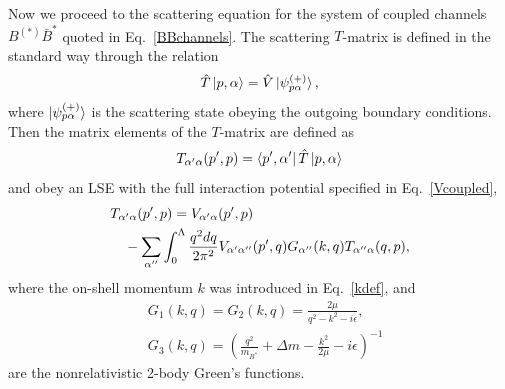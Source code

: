 \documentclass[aps,prd,showpacs,amsmath,twocolumn,superscriptaddress,floatfix,nofootinbib,notitlepage]{revtex4-2}
\newcommand{\be}{\begin{equation}}
\newcommand{\ee}{\end{equation}}
\begin{document}
Now we proceed to the scattering equation for the system of coupled channels $B^{(*)}\bar{B}^*$ quoted in Eq.~\eqref{BBchannels}. 
The scattering $T$-matrix is defined in the standard way through the relation
\be
\hat T \ket{p,\alpha} =\hat{V}\ket{\psi^{(+)}_{p\alpha}},
\ee
where $\ket{\psi^{(+)}_{p\alpha}}$ is the scattering state obeying the outgoing boundary conditions. Then the matrix elements of the $T$-matrix are defined as 
\be 
T_{\alpha'\alpha}(p',p) =\bra{p',\alpha'}\hat T\ket{p,\alpha}
\ee 
and obey an LSE with the full interaction potential specified in Eq.~\eqref{Vcoupled}, 
\begin{align}
&T_{\alpha'\alpha}(p',p)=V_{\alpha'\alpha}(p',p) \label{LSEfull2}\\
&\quad -\sum_{\alpha''}\int_0^\Lambda\frac{q^2dq}{2\pi^2}
V_{\alpha'\alpha''}(p',q)G_{\alpha''}(k,q) T_{\alpha''\alpha}(q,p),\notag
\end{align}
where the on-shell momentum $k$ was introduced in Eq.~\eqref{kdef}, and
\be
\begin{split}
&G_1(k,q)=G_2(k,q)=\frac{2\mu}{q^2-k^2-i\epsilon},\\
&G_3(k,q)=\left(\frac{q^2}{m_{B^*}}+\Delta m-\frac{k^2}{2\mu}-i\epsilon\right)^{-1}
\label{Gpropdef}
\end{split}
\ee
are the nonrelativistic 2-body Green's functions.
\end{document}
